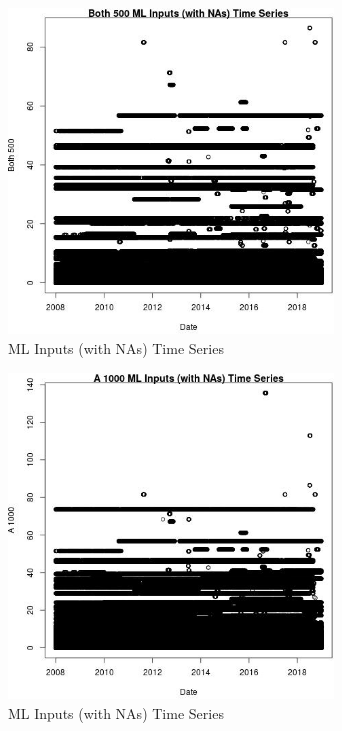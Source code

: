 \begin{figure} 
\centering  
\includegraphics[width=0.77\textwidth]{Code_Outputs/Report_ML_input_PM25_Step4_part_f_de_duplicated_aves_prioritize_24hr_obswNAs_Both_500vDate.jpg} 
\caption{\label{fig:Report_ML_input_PM25_Step4_part_f_de_duplicated_aves_prioritize_24hr_obswNAsBoth_500vDate}ML Inputs (with NAs) Time Series} 
\end{figure} 
 

\clearpage 

\begin{figure} 
\centering  
\includegraphics[width=0.77\textwidth]{Code_Outputs/Report_ML_input_PM25_Step4_part_f_de_duplicated_aves_prioritize_24hr_obswNAs_A_1000vDate.jpg} 
\caption{\label{fig:Report_ML_input_PM25_Step4_part_f_de_duplicated_aves_prioritize_24hr_obswNAsA_1000vDate}ML Inputs (with NAs) Time Series} 
\end{figure} 
 

